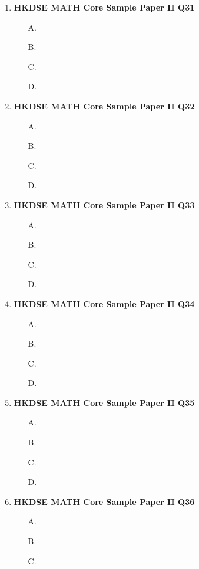 \documentclass[12pt]{article}
\begin{document}
\begin{enumerate}
	\item \textbf{HKDSE MATH Core Sample Paper II Q31}\\
	\begin{enumerate}
		\item[A.]
		\item[B.]
		\item[C.]
		\item[D.]
	\end{enumerate}
	\item \textbf{HKDSE MATH Core Sample Paper II Q32}\\
	\begin{enumerate}
		\item[A.]
		\item[B.]
		\item[C.]
		\item[D.]
	\end{enumerate}
	\item \textbf{HKDSE MATH Core Sample Paper II Q33}\\
	\begin{enumerate}
		\item[A.]
		\item[B.]
		\item[C.]
		\item[D.]
	\end{enumerate}
	\item \textbf{HKDSE MATH Core Sample Paper II Q34}\\
	\begin{enumerate}
		\item[A.]
		\item[B.]
		\item[C.]
		\item[D.]
	\end{enumerate}
	\item \textbf{HKDSE MATH Core Sample Paper II Q35}\\
	\begin{enumerate}
		\item[A.]
		\item[B.]
		\item[C.]
		\item[D.]
	\end{enumerate}
	\item \textbf{HKDSE MATH Core Sample Paper II Q36}\\
	\begin{enumerate}
		\item[A.]
		\item[B.]
		\item[C.]

\end{enumerate}
\end{enumerate}
\end{document}
